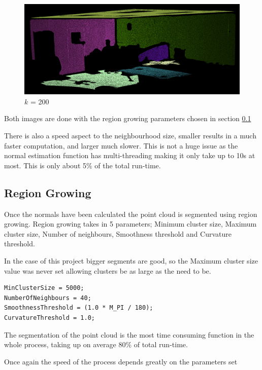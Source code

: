 		\begin{figure}[H]
			\centering
			\includegraphics[width=0.9\linewidth]{"Includes/images/Normal Comp/k = 200 ver 2"}
			\caption{$k$ = 200}
			\label{fig:k=200}
		\end{figure}
		
		Both images are done with the region growing parameters chosen in section \ref{RegionGrowParams}

		
		There is also a speed aspect to the neighbourhood size, smaller results in a much faster computation, and larger much slower. This is not a huge issue as the normal estimation function has multi-threading making it only take up to 10s at most. This is only about 5\% of the total run-time.
		
		
		\subsection{Region Growing}
		\label{RegionGrowParams}
			
		Once the normals have been calculated the point cloud is segmented using region growing. Region growing takes in 5 parameters; Minimum cluster size, Maximum cluster size, Number of neighbours, Smoothness threshold and Curvature threshold.
		
		In the case of this project bigger segments are good, so the Maximum cluster size value was never set allowing clusters be as large as the need to be.
		
		
		
		\begin{lstlisting}
MinClusterSize = 5000;
NumberOfNeighbours = 40;
SmoothnessThreshold = (1.0 * M_PI / 180);
CurvatureThreshold = 1.0;
		\end{lstlisting}
		
		
		
			The segmentation of the point cloud is the most time consuming function in the whole process, taking up on average 80\% of total run-time.
			
			Once again the speed of the process depends greatly on the parameters set
		

